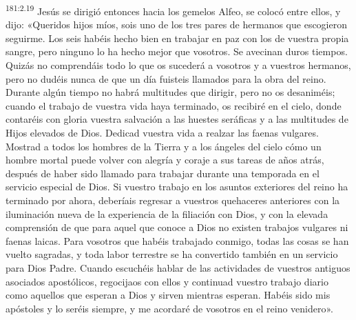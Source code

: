 \par
\textsuperscript{181:2.19} Jesús se dirigió entonces hacia los gemelos Alfeo, se colocó entre ellos, y dijo: «Queridos hijos míos, sois uno de los tres pares de hermanos que escogieron seguirme. Los seis habéis hecho bien en trabajar en paz con los de vuestra propia sangre, pero ninguno lo ha hecho mejor que vosotros. Se avecinan duros tiempos. Quizás no comprendáis todo lo que os sucederá a vosotros y a vuestros hermanos, pero no dudéis nunca de que un día fuisteis llamados para la obra del reino. Durante algún tiempo no habrá multitudes que dirigir, pero no os desaniméis; cuando el trabajo de vuestra vida haya terminado, os recibiré en el cielo, donde contaréis con gloria vuestra salvación a las huestes seráficas y a las multitudes de Hijos elevados de Dios. Dedicad vuestra vida a realzar las faenas vulgares. Mostrad a todos los hombres de la Tierra y a los ángeles del cielo cómo un hombre mortal puede volver con alegría y coraje a sus tareas de años atrás, después de haber sido llamado para trabajar durante una temporada en el servicio especial de Dios. Si vuestro trabajo en los asuntos exteriores del reino ha terminado por ahora, deberíais regresar a vuestros quehaceres anteriores con la iluminación nueva de la experiencia de la filiación con Dios, y con la elevada comprensión de que para aquel que conoce a Dios no existen trabajos vulgares ni faenas laicas. Para vosotros que habéis trabajado conmigo, todas las cosas se han vuelto sagradas, y toda labor terrestre se ha convertido también en un servicio para Dios Padre. Cuando escuchéis hablar de las actividades de vuestros antiguos asociados apostólicos, regocijaos con ellos y continuad vuestro trabajo diario como aquellos que esperan a Dios y sirven mientras esperan. Habéis sido mis apóstoles y lo seréis siempre, y me acordaré de vosotros en el reino venidero».

